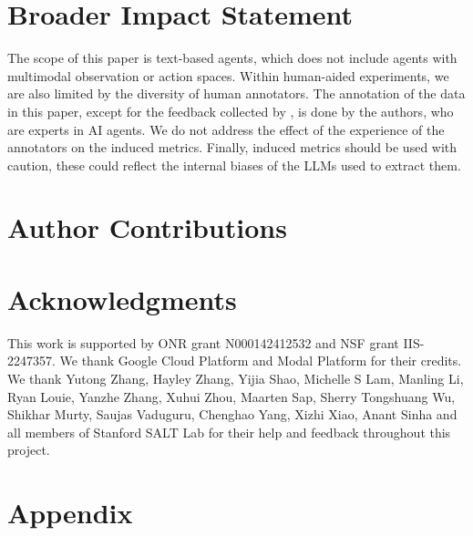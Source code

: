 \documentclass{article} %
\begin{document}
	\section*{Broader Impact Statement}
	The scope of this paper is text-based agents, which does not include agents
	with multimodal observation or action spaces. Within human-aided experiments,
	we are also limited by the diversity of human annotators. The annotation of the
	data in this paper, except for the feedback collected by \citet{shao2024collaborative},
	is done by the authors, who are experts in AI agents. We do not address the
	effect of the experience of the annotators on the induced metrics. Finally,
	induced metrics should be used with caution, these could reflect the internal biases
	of the LLMs used to extract them.

	\section*{Author Contributions}

	\section*{Acknowledgments}
	This work is supported by ONR grant N000142412532 and NSF grant IIS-2247357.
	We thank Google Cloud Platform and Modal Platform for their credits. We thank Yutong
	Zhang, Hayley Zhang, Yijia Shao, Michelle S Lam, Manling Li, Ryan Louie, Yanzhe
	Zhang, Xuhui Zhou, Maarten Sap, Sherry Tongshuang Wu, Shikhar Murty, Saujas
	Vaduguru, Chenghao Yang, Xizhi Xiao, Anant Sinha and all members of Stanford SALT
	Lab for their help and feedback throughout this project.

	
	

	\newpage
	\appendix
	\section*{Appendix}
	
\end{document}
